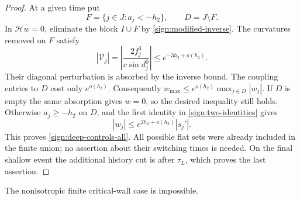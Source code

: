 \begin{proof}
At a given time put
\[
 F=\{j\in J:a_j<-h_2\},\qquad D=J\setminus F.
\]
In \(\mathcal H w=0\), eliminate the block \(I\cup F\) by
\eqref{sign:modified-inverse}.  The curvatures removed on \(F\)
satisfy
\[
 |\mathcal V_j|=
 \left|\frac{2f_j^3}{c\sin d_j^0}\right|
       \le e^{-3h_2+o(h_2)}.
\]
Their diagonal perturbation is absorbed by the inverse bound.
The coupling entries to \(D\) cost only \(e^{o(h_2)}\).
Consequently \(w_{\max}\le e^{o(h_2)}\max_{j\in D}|w_j|\).
If \(D\) is empty the same absorption gives \(w=0\), so the
desired inequality still holds.  Otherwise \(a_j\ge-h_2\) on
\(D\), and the first identity in \eqref{sign:two-identities}
gives
\[
 |w_j|\le e^{2h_2+o(h_2)}|s_j'|.
\]
This proves \eqref{sign:deep-controls-all}.  All possible flat sets
were already included in the finite union; no assertion about their
switching times is needed.  On the final shallow event the additional
history cut is after \(\tau_L\), which proves the last assertion.
\end{proof}

\begin{theorem}\label{thm:last-site}
The nonisotropic finite critical-wall case is impossible.
\end{theorem}

